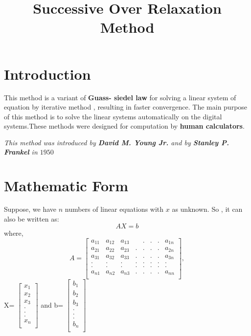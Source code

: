 \documentclass{article}
\title{ Successive Over Relaxation Method}
\begin{document}
\maketitle

\section{Introduction}

This method is a variant of \textbf{Guass- siedel law} for solving a linear system of equation by iterative method , resulting in faster convergence. The main purpose of this method is to solve the linear systems automatically on the digital systems.These methods were designed for computation by \textbf{human calculators}.\linebreak

\hspace*{5mm}\textit{This method was introduced by  \textbf{David M. Young Jr.} and by \textbf{Stanley P. Frankel} in $1950$}

\section{ Mathematic Form}

Suppose, we have $n$ numbers of linear equations with $x$ as unknown.
So , it can also be written as:
\begin{equation} \label{eq1}
AX = {b}
\end{equation}
where, \linebreak
\hspace*{10mm}
\[ A=
\begin{bmatrix}
a_{11} & a_{12} & a_{13} &  & . & . & . & a_{1n}\\
a_{21} & a_{22} & a_{23} & . & . & . & . & a_{2n}\\
a_{31} & a_{32} & a_{33} & . & . & . & . & a_{3n}\\
. & . & . & . & . & . & . & .\\ 
. & . & . & . & . & . & . & .\\
a_{n1} & a_{n2} & a_{n3} & . & . & . & . & a_{nn}\\ 
\end{bmatrix}
,
\] 
X=
$\begin{bmatrix}
x_{1}\\
x_{2}\\
x_{3}\\
.\\
.\\
.\\
x_{n}\\

\end{bmatrix}$
\hspace*{3mm}
and b=
$\begin{bmatrix}
b_{1}\\
b_{2}\\
b_{3}\\
.\\
.\\
.\\
b_{n}\\

\end{bmatrix}$\linebreak
\end{document}
